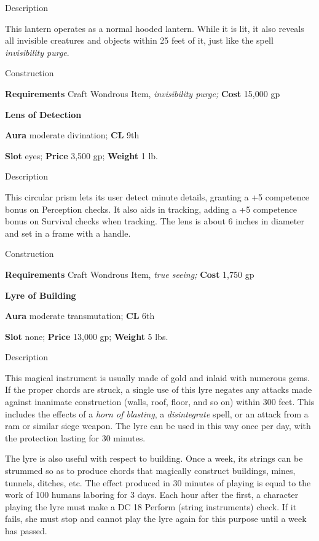 Description
				
This lantern operates as a normal hooded lantern. While it is lit, it also reveals all invisible creatures and objects within 25 feet of it, just like the spell \textit{invisibility purge}. 
				
Construction
				
\textbf{Requirements} Craft Wondrous Item,\textit{ invisibility purge;}\textbf{ Cost }15,000 gp
				
\textbf{Lens of Detection}
				
\textbf{Aura} moderate divination;\textbf{ CL }9th
				
\textbf{Slot} eyes; \textbf{Price} 3,500 gp; \textbf{Weight} 1 lb.
				
Description
				
This circular prism lets its user detect minute details, granting a +5 competence bonus on Perception checks. It also aids in tracking, adding a +5 competence bonus on Survival checks when tracking. The lens is about 6 inches in diameter and set in a frame with a handle. 
				
Construction
				
\textbf{Requirements} Craft Wondrous Item,\textit{ true seeing;}\textbf{ Cost }1,750 gp
				
\textbf{Lyre of Building}
				
\textbf{Aura} moderate transmutation;\textbf{ CL }6th
				
\textbf{Slot} none; \textbf{Price} 13,000 gp; \textbf{Weight} 5 lbs.
				
Description
				
This magical instrument is usually made of gold and inlaid with numerous gems. If the proper chords are struck, a single use of this lyre negates any attacks made against inanimate construction (walls, roof, floor, and so on) within 300 feet. This includes the effects of a \textit{horn of blasting}, a \textit{disintegrate} spell, or an attack from a ram or similar siege weapon. The lyre can be used in this way once per day, with the protection lasting for 30 minutes.
				
The lyre is also useful with respect to building. Once a week, its strings can be strummed so as to produce chords that magically construct buildings, mines, tunnels, ditches, etc. The effect produced in 30 minutes of playing is equal to the work of 100 humans laboring for 3 days. Each hour after the first, a character playing the lyre must make a DC 18 Perform (string instruments) check. If it fails, she must stop and cannot play the lyre again for this purpose until a week has passed. 
				
